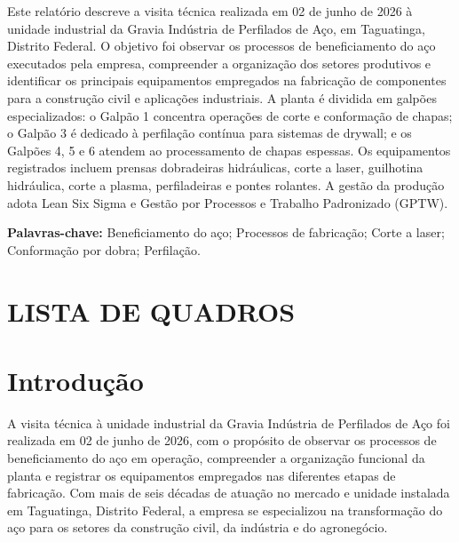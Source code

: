 \documentclass[12pt,a4paper,oneside,brazil,chapter=TITLE]{article}
\makeatletter
\newcommand{\secbreak}{\clearpage}
\let\oldsection\section
\renewcommand{\section}{\secbreak\oldsection}
\renewcommand{\listofquadros}{\section*{LISTA DE QUADROS}\@starttoc{loq}}
\makeatother
\begin{document}
\noindent Este relatório descreve a visita técnica realizada em 02 de junho de 2026 à unidade industrial da Gravia Indústria de Perfilados de Aço, em Taguatinga, Distrito Federal. O objetivo foi observar os processos de beneficiamento do aço executados pela empresa, compreender a organização dos setores produtivos e identificar os principais equipamentos empregados na fabricação de componentes para a construção civil e aplicações industriais. A planta é dividida em galpões especializados: o Galpão 1 concentra operações de corte e conformação de chapas; o Galpão 3 é dedicado à perfilação contínua para sistemas de drywall; e os Galpões 4, 5 e 6 atendem ao processamento de chapas espessas. Os equipamentos registrados incluem prensas dobradeiras hidráulicas, corte a laser, guilhotina hidráulica, corte a plasma, perfiladeiras e pontes rolantes. A gestão da produção adota Lean Six Sigma e Gestão por Processos e Trabalho Padronizado (GPTW).

\vspace{12pt}
\noindent\textbf{Palavras-chave:} Beneficiamento do aço; Processos de fabricação; Corte a laser; Conformação por dobra; Perfilação.

\clearpage
\listofquadros

\clearpage
\tableofcontents


\section{Introdução}

A visita técnica à unidade industrial da Gravia Indústria de Perfilados de Aço foi realizada em 02 de junho de 2026, com o propósito de observar os processos de beneficiamento do aço em operação, compreender a organização funcional da planta e registrar os equipamentos empregados nas diferentes etapas de fabricação. Com mais de seis décadas de atuação no mercado e unidade instalada em Taguatinga, Distrito Federal, a empresa se especializou na transformação do aço para os setores da construção civil, da indústria e do agronegócio.
\end{document}
